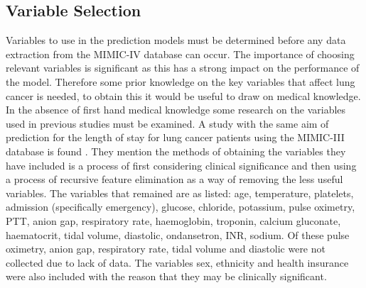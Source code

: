 \documentclass[11pt]{article}
\begin{document}
\subsection{Variable Selection}
Variables to use in the prediction models must be determined before any data extraction from the MIMIC-IV database can occur. The importance of choosing relevant variables is significant as this has a strong impact on the performance of the model. Therefore some prior knowledge on the key variables that affect lung cancer is needed, to obtain this it would be useful to draw on medical knowledge. In the absence of first hand medical knowledge some research on the variables used in previous studies must be examined.   %
A study with the same aim of prediction for the length of stay for lung cancer patients using the MIMIC-III database is found \cite{Alsinglawi123}. They mention the methods of obtaining the variables they have included is a process of first considering clinical significance and then using a process of recursive feature elimination as a way of removing the less useful variables. The variables that remained are as listed: age, temperature, platelets, admission (specifically emergency), glucose, chloride, potassium, pulse oximetry, PTT, anion gap, respiratory rate, haemoglobin, troponin, calcium gluconate, haematocrit, tidal volume, diastolic, ondansetron, INR, sodium. Of these pulse oximetry, anion gap, respiratory rate, tidal volume and diastolic were not collected due to lack of data. The variables sex, ethnicity and health insurance were also included with the reason that they may be clinically significant. 


\end{document}
